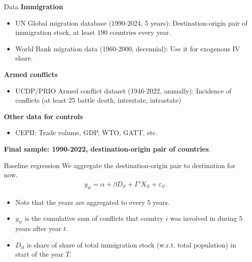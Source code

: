 \documentclass[notes,11pt, aspectratio=169]{beamer}
\begin{document}
\begin{frame}{Data}
	\textbf{Immigration}
	\begin{itemize}
		\item UN Global migration database (1990-2024, 5 years): Destination-origin pair of immigration stock, at least 190 countries every year. 
		\item World Bank migration data (1960-2000, decennial): Use it for exogenous IV share.
	\end{itemize}\vspace{1em}

	\textbf{Armed conflicts}
	\begin{itemize}
		\item UCDP/PRIO Armed conflict dataset (1946-2022, annually): Incidence of conflicts (at least 25 battle death, interstate, intrastate) 
	\end{itemize}\vspace{1em}

	\textbf{Other data for controls}
	\begin{itemize}
		\item CEPII: Trade volume, GDP, WTO, GATT, etc.
	\end{itemize}\vspace{1em}
	\begin{center}
	\textbf{Final sample: 1990-2022, destination-origin pair of countries}.
	\end{center}
\end{frame}

\begin{frame}{Baseline regression}
	We aggregate the destination-origin pair to destination for now.
\begin{align*}
	y_{it} = \alpha + \beta D_{it} + \Gamma' X_{it} + \varepsilon_{it}. 
\end{align*}	

\begin{itemize}
	\item Note that the years are aggregated to every 5 years.
	\item $y_{it}$ is the cumulative sum of conflicts that country $i$ was involved in during 5 years after year $t$.
	\item $D_{it}$ is share of share of total immigration stock (w.r.t. total population) in start of the year $T$. 
\end{itemize}
\end{frame}
\end{document}
